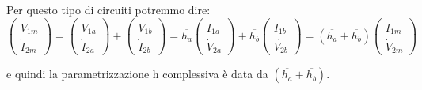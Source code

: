 \documentclass[a4paper,11pt]{article}
\begin{document}
Per questo tipo di circuiti potremmo dire:
$$
\begin{pmatrix}
	\dot{V}_{1m} \\ \dot{I}_{2m}
\end{pmatrix}
=
\begin{pmatrix}
	\dot{V}_{1a} \\ \dot{I}_{2a}
\end{pmatrix}
+
\begin{pmatrix}
	\dot{V}_{1b} \\ \dot{I}_{2b}
\end{pmatrix}
=
\overline{h_a}
\begin{pmatrix}
	\dot{I}_{1a} \\ \dot{V}_{2a}
\end{pmatrix}
+
\overline{h_b}
\begin{pmatrix}
	\dot{I}_{1b} \\ \dot{V_{2b}}
\end{pmatrix}
=
(\overline{h_a} + \overline{h_b})
\begin{pmatrix}
	\dot{I}_{1m} \\ \dot{V}_{2m}
\end{pmatrix}
$$

e quindi la parametrizzazione h complessiva è data da $(\overline{h_a} + \overline{h_b})$.
\end{document}
